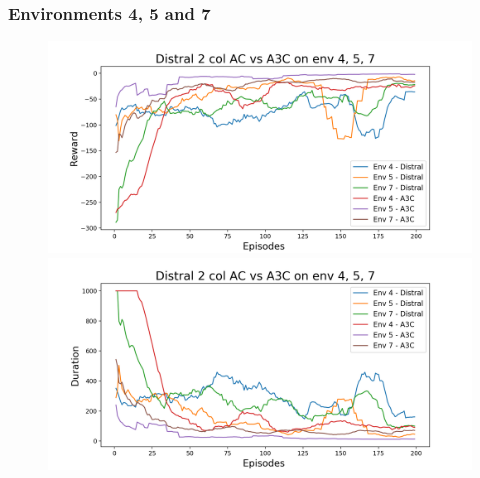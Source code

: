 \documentclass[12pt]{report}
\begin{document}
\subsubsection{Environments 4, 5 and 7}
\begin{figure}[H]
\centering
\begin{minipage}{.5\textwidth}
\centering
\includegraphics[width=\textwidth]{figs/d2_col_ac/d2_col_ac_4_5_7_rwd.png}
\end{minipage}%
\centering
\begin{minipage}{.5\textwidth}
\centering
\includegraphics[width=\textwidth]{figs/d2_col_ac/d2_col_ac_4_5_7_dur.png}
\end{minipage}%
\end{figure}
\end{document}

